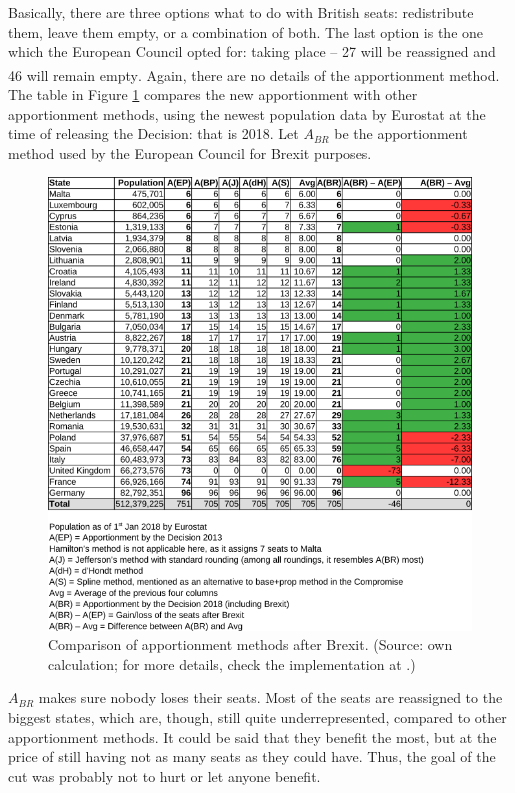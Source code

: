 \documentclass[a4paper]{article}
\theoremstyle{definition}
\begin{document}
Basically, there are three options what to do with British seats: redistribute them, leave them empty, or a combination of both. The last option is the one which the European Council opted for: taking place -- 27 will be reassigned and 46 will remain empty\textsuperscript{\cite{ec2018}}. Again, there are no details of the apportionment method. The table in Figure \ref{fig:fig3} compares the new apportionment with other apportionment methods, using the newest population data by Eurostat at the time of releasing the Decision: that is 2018. Let $A_{BR}$ be the apportionment method used by the European Council for Brexit purposes.

\begin{figure}[th!]
	\begin{center}
		\includegraphics[scale=0.47]{g3522.png}
		\caption{Comparison of apportionment methods after Brexit. (Source: own calculation; for more details, check the implementation at \cite{github}.)}
		\label{fig:fig3}
	\end{center}
\end{figure}

$A_{BR}$ makes sure nobody loses their seats. Most of the seats are reassigned to the biggest states, which are, though, still quite underrepresented, compared to other apportionment methods. It could be said that they benefit the most, but at the price of still having not as many seats as they could have. Thus, the goal of the cut was probably not to hurt or let anyone benefit.
\end{document}
